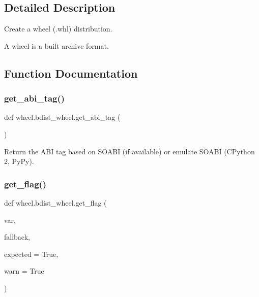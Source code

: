 \subsection{Detailed Description}
\begin{DoxyVerb}Create a wheel (.whl) distribution.

A wheel is a built archive format.
\end{DoxyVerb}
 

\subsection{Function Documentation}
\mbox{\label{namespacewheel_1_1bdist__wheel_a6eb23762f46bbd118ec204d9aa5bc875}} 
\subsubsection{\texorpdfstring{get\+\_\+abi\+\_\+tag()}{get\_abi\_tag()}}
{\footnotesize\ttfamily def wheel.\+bdist\+\_\+wheel.\+get\+\_\+abi\+\_\+tag (\begin{DoxyParamCaption}{ }\end{DoxyParamCaption})}

\begin{DoxyVerb}Return the ABI tag based on SOABI (if available) or emulate SOABI
(CPython 2, PyPy).\end{DoxyVerb}
 \mbox{\label{namespacewheel_1_1bdist__wheel_ad78961082011fad391e05a61a9e67a3b}} 
\subsubsection{\texorpdfstring{get\+\_\+flag()}{get\_flag()}}
{\footnotesize\ttfamily def wheel.\+bdist\+\_\+wheel.\+get\+\_\+flag (\begin{DoxyParamCaption}\item[{}]{var,  }\item[{}]{fallback,  }\item[{}]{expected = {\ttfamily True},  }\item[{}]{warn = {\ttfamily True} }\end{DoxyParamCaption})}

